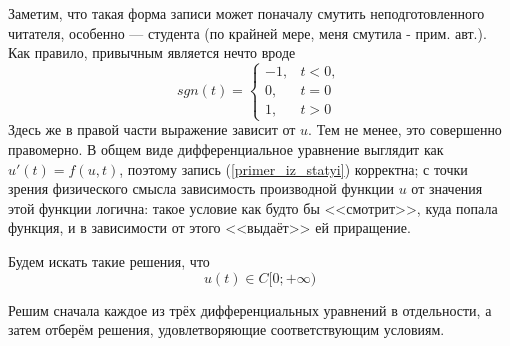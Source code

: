 Заметим, что такая форма записи может поначалу смутить неподготовленного читателя, особенно --- студента (по крайней мере, меня смутила - прим. авт.).
Как правило, привычным является нечто вроде
\begin{equation*}
	sgn(t)=
	\left\{
		\begin{array}{ll}
			-1, & t < 0, \\
			 0, & t = 0 \\
			 1, & t > 0
		\end{array}
	\right.
\end{equation*}
Здесь же в правой части выражение зависит от $u$.
Тем не менее, это совершенно правомерно.
В общем виде дифференциальное уравнение выглядит как $u'(t)=f(u,t)$,
поэтому запись (\ref{primer_iz_statyi}) корректна;
с точки зрения физического смысла зависимость производной функции $u$ от значения этой функции логична:
такое условие как будто бы <<смотрит>>, куда попала функция, и в зависимости от этого <<выдаёт>> ей приращение.


Будем искать такие решения, что
\begin{equation}
	u(t) \in C[0; +\infty)
\end{equation}

Решим сначала каждое из трёх дифференциальных уравнений в отдельности, а затем отберём решения,
удовлетворяющие соответствующим условиям.

